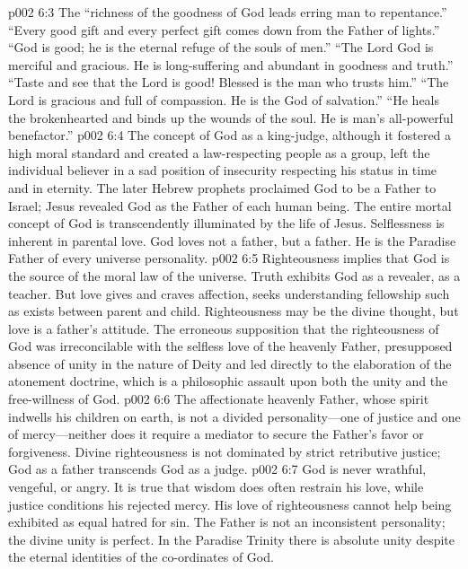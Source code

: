 \pc \vs p002 6:3 The “richness of the goodness of God leads erring man to repentance.” “Every good gift and every perfect gift comes down from the Father of lights.” “God is good; he is the eternal refuge of the souls of men.” “The Lord God is merciful and gracious. He is long\hyp{}suffering and abundant in goodness and truth.” “Taste and see that the Lord is good! Blessed is the man who trusts him.” “The Lord is gracious and full of compassion. He is the God of salvation.” “He heals the brokenhearted and binds up the wounds of the soul. He is man’s all\hyp{}powerful benefactor.”
\pc \vs p002 6:4 The concept of God as a king\hyp{}judge, although it fostered a high moral standard and created a law\hyp{}respecting people as a group, left the individual believer in a sad position of insecurity respecting his status in time and in eternity. The later Hebrew prophets proclaimed God to be a Father to Israel; Jesus revealed God as the Father of each human being. The entire mortal concept of God is transcendently illuminated by the life of Jesus. Selflessness is inherent in parental love. God loves not  a father, but  a father. He is the Paradise Father of every universe personality.
\pc \vs p002 6:5 Righteousness implies that God is the source of the moral law of the universe. Truth exhibits God as a revealer, as a teacher. But love gives and craves affection, seeks understanding fellowship such as exists between parent and child. Righteousness may be the divine thought, but love is a father’s attitude. The erroneous supposition that the righteousness of God was irreconcilable with the selfless love of the heavenly Father, presupposed absence of unity in the nature of Deity and led directly to the elaboration of the atonement doctrine, which is a philosophic assault upon both the unity and the free\hyp{}willness of God.
\vs p002 6:6 The affectionate heavenly Father, whose spirit indwells his children on earth, is not a divided personality---one of justice and one of mercy---neither does it require a mediator to secure the Father’s favor or forgiveness. Divine righteousness is not dominated by strict retributive justice; God as a father transcends God as a judge.
\pc \vs p002 6:7 God is never wrathful, vengeful, or angry. It is true that wisdom does often restrain his love, while justice conditions his rejected mercy. His love of righteousness cannot help being exhibited as equal hatred for sin. The Father is not an inconsistent personality; the divine unity is perfect. In the Paradise Trinity there is absolute unity despite the eternal identities of the co\hyp{}ordinates of God.
